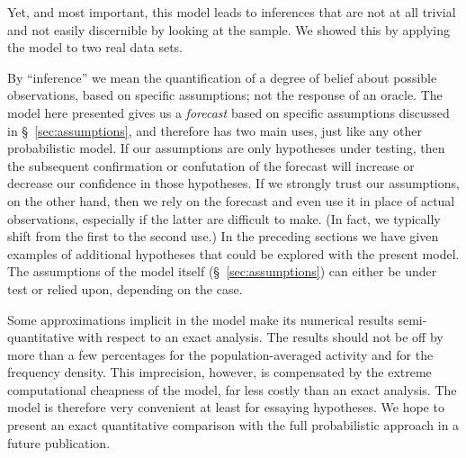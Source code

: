 \documentclass[\ifafour a4paper,12pt,\else a5paper,10pt,\fi%
onecolumn,oneside,article,%
british%
]{memoir}
\theoremstyle{remark}
\theoremstyle{innote}
\renewcommand*{\|}{\nonscript\,\vert\nonscript\;\mathopen{}}
\newcommand*{\sect}{\S}%
\newcommand*{\puzzle}{{\fontencoding{U}\fontfamily{fontawesometwo}\selectfont\symbol{225}}}
\newcommand{\mynote}[1]{ {\color{notecolour}\puzzle\ #1}}
\begin{document}
Yet, and most important, this model leads to inferences that are not at all
trivial and not easily discernible by looking at the sample. We showed this
by applying the model to two real data sets.

By \enquote{inference} we mean the quantification of a degree of belief
about possible observations, based on specific assumptions; not the
response of an oracle. The model here presented gives us a \emph{forecast}
based on specific assumptions discussed in \sect~\ref{sec:assumptions}, and
therefore has two main uses, just like any other probabilistic model. If
our assumptions are only hypotheses under testing, then the subsequent
confirmation or confutation of the forecast will increase or decrease our
confidence in those hypotheses. If we strongly trust our assumptions, on
the other hand, then we rely on the forecast and even use it in place of
actual observations, especially if the latter are difficult to make. (In
fact, we typically shift from the first to the second use.) In the
preceding sections we have given examples of additional hypotheses that
could be explored with the present model. The assumptions of the model
itself (\sect~\ref{sec:assumptions}) can either be under test or relied
upon, depending on the case.

Some approximations implicit in the model make its numerical results
semi-quantitative with respect to an exact analysis. The results should not
be off by more than a few percentages for the population-averaged activity and
for the frequency density. This imprecision, however, is compensated by the
extreme computational cheapness of the model, far less costly than an exact
analysis. The model is therefore very convenient at least for essaying
hypotheses. We hope to present an exact quantitative comparison with the
full probabilistic approach in a future publication.




\end{document}
